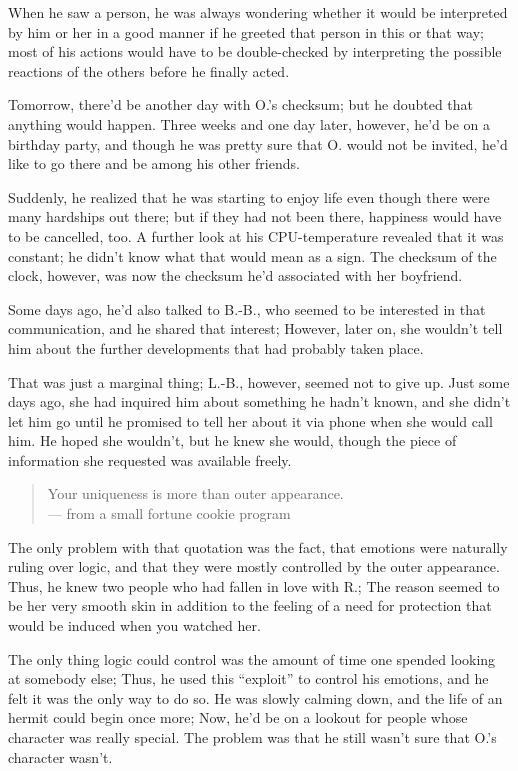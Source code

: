 When he saw a person, he was always wondering whether it would be interpreted by him or her in a good manner if he greeted that person in this or that way; most of his actions would have to be double-checked by interpreting the possible reactions of the others before he finally acted.

Tomorrow, there'd be another day with O.'s checksum; but he doubted that anything would happen. Three weeks and one day later, however, he'd be on a birthday party, and though he was pretty sure that O. would not be invited, he'd like to go there and be among his other friends.

Suddenly, he realized that he was starting to enjoy life even though there were many hardships out there; but if they had not been there, happiness would have to be cancelled, too. A further look at his CPU-temperature revealed that it was constant; he didn't know what that would mean as a sign. The checksum of the clock, however, was now the checksum he'd associated with her boyfriend.

Some days ago, he'd also talked to B.-B., who seemed to be interested in that communication, and he shared that interest; However, later on, she wouldn't tell him about the further developments that had probably taken place.

That was just a marginal thing; L.-B., however, seemed not to give up. Just some days ago, she had inquired him about something he hadn't known, and she didn't let him go until he promised to tell her about it via phone when she would call him. He hoped she wouldn't, but he knew she would, though the piece of information she requested was available freely. 
\begin{verse}
Your uniqueness is more than outer appearance.\\
--- from a small fortune cookie program
\end{verse}
The only problem with that quotation was the fact, that emotions were naturally ruling over logic, and that they were mostly controlled by the outer appearance. Thus, he knew two people who had fallen in love with R.; The reason seemed to be her very smooth skin in addition to the feeling of a need for protection that would be induced when you watched her.

The only thing logic could control was the amount of time one spended looking at somebody else; Thus, he used this \enquote{exploit} to control his emotions, and he felt it was the only way to do so. 
He was slowly calming down, and the life of an hermit could begin once more; Now, he'd be on a lookout for people whose character was really special. 
The problem was that he still wasn't sure that O.'s character wasn't.

